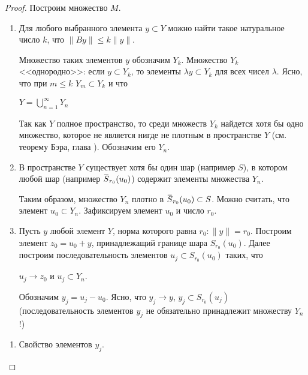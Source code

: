 \documentclass[12pt,a4paper,titlepage,oneside]{book}
\newcommand{\overbar}[1]{\mkern 1.5mu\overline{\mkern-1.5mu#1\mkern-1.5mu}\mkern 1.5mu}
\theoremstyle{definition}
\theoremstyle{plain}
\theoremstyle{break}
\theoremstyle{remark}
\theoremstyle{remark}
\theoremstyle{remark}
\theoremstyle{remark}
\theoremstyle{plain}
\theoremstyle{plain}
\begin{document}
\begin{proof}
	
Построим множество $M$.

\begin{enumerate}
	\item Для любого выбранного элемента $y \subset Y$ можно найти такое натуральное число $k$, что $\lVert By\rVert \leqslant k\lVert y\rVert$.
	
	Множество таких элементов $y$ обозначим $Y_k$. Множество $Y_k$ <<однородно>>: если $y \subset Y_k$, то элементы $\lambda y \subset Y_k$ для всех чисел $\lambda$. Ясно, что при $m \leqslant k$ $Y_m \subset Y_k$ и что

\begin{center}	

	$Y=\bigcup\limits_{n=1}^\infty Y_n$
	
\end{center}
	
	Так как $Y$ полное пространство, то среди множеств $Y_k$ найдется хотя бы одно множество, которое не является нигде не плотным в пространстве $Y$ (см. теорему Бэра, глава \uppercase\expandafter{}). Обозначим его $Y_n$.
	
	\item В пространстве $Y$ существует хотя бы один шар (например $S$), в котором любой шар (например $\overbar{S}_{r_0}(u_0)$) содержит элементы множества $Y_n$.
	
	Таким образом, множество $Y_n$ плотно в $\overbar{S}_{r_0}(u_0)\subset S$. Можно считать, что элемент $u_0 \subset Y_n$. Зафиксируем элемент $u_0$ и число $r_0$.
	
	\item Пусть $y$ любой элемент $Y$, норма которого равна $r_0:\lVert y\rVert=r_0$. Построим элемент $z_0=u_0+y$, принадлежащий границе шара $S_{r_0}(u_0)$. Далее построим последовательность элементов $u_j \subset S_{r_0}(u_0)$ таких, что

\begin{center}	

	$u_j \to z_0$ и $u_j \subset Y_n$.
	
\end{center}

Обозначим $y_j=u_j-u_0$. Ясно, что $y_j \to y$, $y_j \subset S_{r_0}(u_j)$ (последовательность элементов $y_j$ не обязательно принадлежит множеству $Y_n$!)
	
\end{enumerate}


\begin{enumerate}
\item Свойство элементов $y_j$.


\end{enumerate}
\end{proof}
\end{document}
